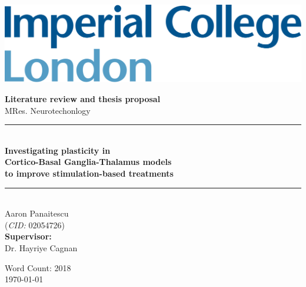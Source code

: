 \begin{titlepage}
	\newcommand{\HRule}{\rule{\linewidth}{0.5mm}}
	\setlength{\topmargin}{0in}
	\center

	\begin{flushleft} \large
		\begin{minipage}{0.4\textwidth}
			\includegraphics[scale=0.14]{imperial.png}
		\end{minipage}
	\end{flushleft}
	\vspace{4cm}

	\textbf{\large Literature review and thesis proposal}\\[0.1cm]
	{\large MRes. Neurotechonlogy}\\[0.5cm]

	\HRule \\[0.4cm]
	{\Large \bfseries Investigating plasticity in \\ Cortico-Basal Ganglia-Thalamus models \\ to improve stimulation-based treatments }
	\HRule \\[1cm]


	{\large Aaron Panaitescu \\
	(\textit{CID:} 02054726) \\[0.4cm]
	\textbf{Supervisor:} \\
	Dr. Hayriye Cagnan}


	\vfill
	{Word Count: 2018}\\[0.4cm]
	{\large \today}\\[0.8cm]
\end{titlepage}
\tableofcontents
\vfill
\printacronymsinline

